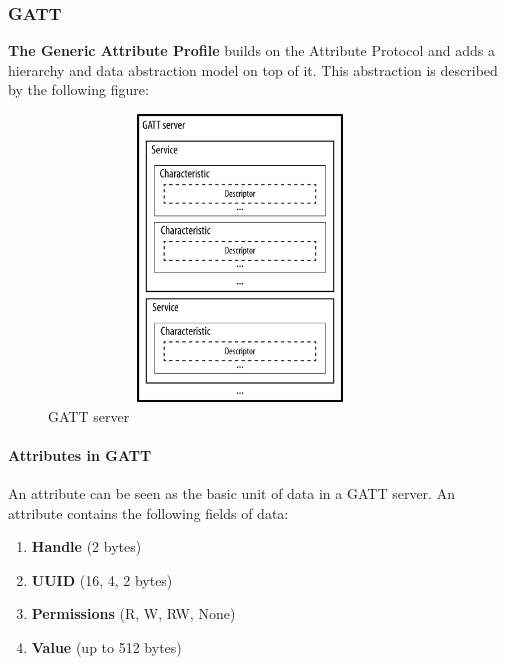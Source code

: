 \subsubsection{GATT}
\textbf{The Generic Attribute Profile} builds on the Attribute Protocol and adds a hierarchy and data abstraction model on top of it. This abstraction is described by the following figure:
\begin{figure}[ht]
	\centering
	\includegraphics[width=4in, height=3in]{images/gatt_server.png}
	\caption{GATT server}
\end{figure}
\paragraph{Attributes in GATT}
An attribute can be seen as the basic unit of data in a GATT server. An attribute contains the following fields of data:
\begin{enumerate}
	\item \textbf{Handle} (2 bytes)
	\item \textbf{UUID} (16, 4, 2 bytes)
	\item \textbf{Permissions} (R, W, RW, None)
	\item \textbf{Value} (up to 512 bytes)
\end{enumerate}
